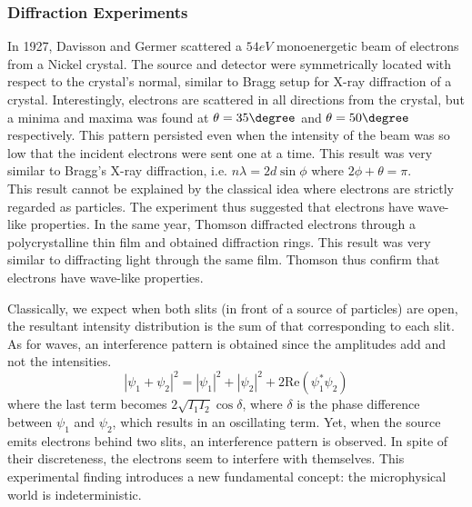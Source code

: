 \documentclass[a4paper]{article}
\begin{document}
\subsubsection*{Diffraction Experiments}
\begin{Note}
In 1927, Davisson and Germer scattered a $54eV$ monoenergetic beam of electrons from a Nickel crystal. The source and detector were symmetrically located with respect to the crystal's normal, similar to Bragg setup for X-ray diffraction of a crystal. Interestingly, electrons are scattered in all directions from the crystal, but a minima and maxima was found at $\theta = 35\degree$ and $\theta=50\degree$ respectively. This pattern persisted even when the intensity of the beam was so low that the incident electrons were sent one at a time. This result was very similar to Bragg's X-ray diffraction, i.e. $n\lambda=2d\sin\phi $ where $2\phi+\theta=\pi$.\\[5pt]
This result cannot be explained by the classical idea where electrons are strictly regarded as particles. The experiment thus suggested that electrons have wave-like properties. In the same year, Thomson diffracted electrons through a polycrystalline thin film and obtained diffraction rings. This result was very similar to diffracting light through the same film. Thomson thus confirm that electrons have wave-like properties.
\end{Note}
\begin{Note}
Classically, we expect when both slits (in front of a source of particles) are open, the resultant intensity distribution is the sum of that corresponding to each slit. As for waves, an interference pattern is obtained since the amplitudes add and not the intensities.
$$|\psi_1+\psi_2|^2=|\psi_1|^2+|\psi_2|^2+2\text{Re}(\psi_1^*\psi_2)$$
where the last term becomes $2\sqrt{I_1I_2}\cos\delta$, where $\delta$ is the phase difference between $\psi_1$ and $\psi_2$, which results in an oscillating term. Yet, when the source emits electrons behind two slits, an interference pattern is observed. In spite of their discreteness, the electrons seem to interfere with themselves. This experimental finding introduces a new fundamental concept: the microphysical world is indeterministic. 
\end{Note}
\newpage
\end{document}
